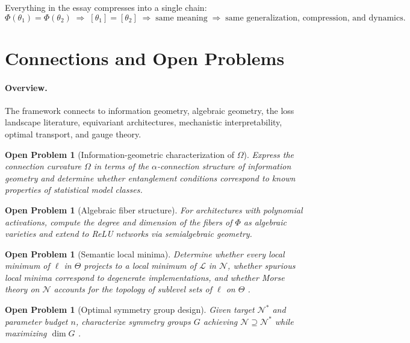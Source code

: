 \documentclass[twocolumn,10pt]{article}
\theoremstyle{thmstyle}
\theoremstyle{defstyle}
\newtheorem{openp}[theorem]{Open Problem}
\begin{document}
Everything in the essay compresses into a single chain:
\begin{equation}
\Phi(\theta_1) = \Phi(\theta_2)
\;\Rightarrow\; [\theta_1] = [\theta_2]
\;\Rightarrow\; \text{same meaning}
\;\Rightarrow\; \text{same generalization, compression, and dynamics.}
\label{eq:invariance-chain}
\end{equation}

\section{Connections and Open Problems}
\label{sec:connections}

\paragraph{Overview.}
The framework connects to information geometry, algebraic geometry,
the loss landscape literature, equivariant architectures, mechanistic
interpretability, optimal transport, and gauge theory.

\begin{openp}[Information-geometric characterization of $\Omega$]
Express the connection curvature $\Omega$ in terms of the
$\alpha$-connection structure of information geometry
\citep{amari1998natural} and determine whether entanglement conditions
correspond to known properties of statistical model classes.
\end{openp}

\begin{openp}[Algebraic fiber structure]
For architectures with polynomial activations, compute the degree and
dimension of the fibers of $\Phi$ as algebraic varieties
\citep{kileel2019expressive} and extend to ReLU networks via
semialgebraic geometry.
\end{openp}

\begin{openp}[Semantic local minima]
Determine whether every local minimum of $\ell$ in $\Theta$ projects
to a local minimum of $\mathcal{L}$ in $\mathcal{N}$, whether spurious
local minima correspond to degenerate implementations, and whether
Morse theory on $\mathcal{N}$ accounts for the topology of sublevel
sets of $\ell$ on $\Theta$ \citep{bhojanapalli2016global}.
\end{openp}

\begin{openp}[Optimal symmetry group design]
Given target $\mathcal{N}^*$ and parameter budget $n$, characterize
symmetry groups $G$ achieving $\mathcal{N} \supseteq \mathcal{N}^*$
while maximizing $\dim G$ \citep{zaheer2017deep,thomas2018tensor}.
\end{openp}
\end{document}

